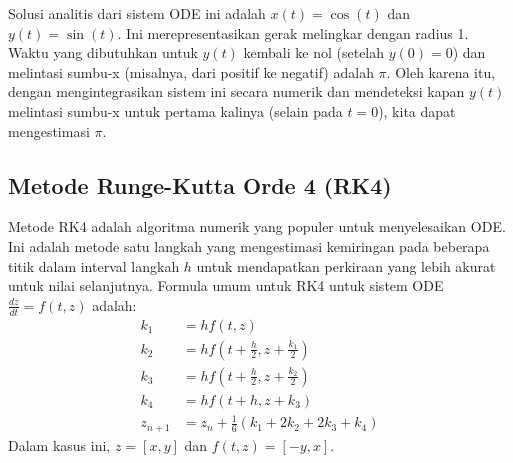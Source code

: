 \documentclass[conference]{IEEEtran}
\begin{document}
Solusi analitis dari sistem ODE ini adalah $x(t) = \cos(t)$ dan $y(t) = \sin(t)$. Ini merepresentasikan gerak melingkar dengan radius 1. Waktu yang dibutuhkan untuk $y(t)$ kembali ke nol (setelah $y(0)=0$) dan melintasi sumbu-x (misalnya, dari positif ke negatif) adalah $\pi$. Oleh karena itu, dengan mengintegrasikan sistem ini secara numerik dan mendeteksi kapan $y(t)$ melintasi sumbu-x untuk pertama kalinya (selain pada $t=0$), kita dapat mengestimasi $\pi$.

\subsection{Metode Runge-Kutta Orde 4 (RK4)}
Metode RK4 adalah algoritma numerik yang populer untuk menyelesaikan ODE. Ini adalah metode satu langkah yang mengestimasi kemiringan pada beberapa titik dalam interval langkah $h$ untuk mendapatkan perkiraan yang lebih akurat untuk nilai selanjutnya. Formula umum untuk RK4 untuk sistem ODE $\frac{dz}{dt} = f(t, z)$ adalah:
\begin{align}
k_1 &= h f(t, z) \\
k_2 &= h f\left(t + \frac{h}{2}, z + \frac{k_1}{2}\right) \\
k_3 &= h f\left(t + \frac{h}{2}, z + \frac{k_2}{2}\right) \\
k_4 &= h f(t + h, z + k_3) \\
z_{n+1} &= z_n + \frac{1}{6}(k_1 + 2k_2 + 2k_3 + k_4)
\end{align}
Dalam kasus ini, $z = [x, y]$ dan $f(t, z) = [-y, x]$.
\end{document}
